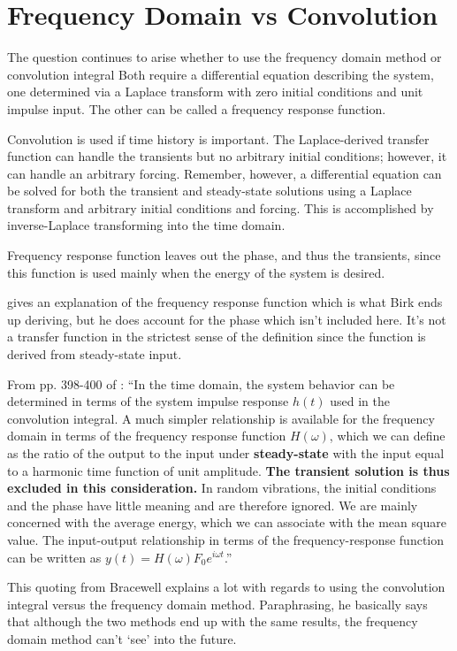 \documentclass[10pt,letterpaper]{article}
\begin{document}
\section{Frequency Domain vs Convolution}
The question continues to arise whether to use the frequency domain method or convolution integral 
Both require a differential equation describing the system, one determined via a Laplace transform with zero initial conditions and unit impulse input.
The other can be called a frequency response function.

Convolution is used if time history is important.
The Laplace-derived transfer function can handle the transients but no arbitrary initial conditions; however, it can handle an arbitrary forcing.
Remember, however, a differential equation can be solved for both the transient and steady-state solutions using a Laplace transform and arbitrary initial conditions and forcing.
This is accomplished by inverse-Laplace transforming into the time domain.

Frequency response function leaves out the phase, and thus the transients, since this function is used mainly when the energy of the system is desired.

\citet{thomson98.1} gives an explanation of the frequency response function which is what Birk ends up deriving, but he does account for the phase which isn't included here.
It's not a transfer function in the strictest sense of the definition since the function is derived from steady-state input.

From pp. 398-400 of \citet{thomson98.1}: ``In the time domain, the system behavior can be determined in terms of the system impulse response $h(t)$ used in the convolution integral.
A much simpler relationship is available for the frequency domain in terms of the frequency response function $H(\omega)$, which we can define as the ratio of the output to the input under \textbf{steady-state} with the input equal to a harmonic time function of unit amplitude.
\textbf{The transient solution is thus excluded in this consideration.}
In random vibrations, the initial conditions and the phase have little meaning and are therefore ignored.
We are mainly concerned with the average energy, which we can associate with the mean square value.
The input-output relationship in terms of the frequency-response function can be written as $y(t) = H(\omega)F_0 e^{i\omega t}$.''

This quoting from Bracewell explains a lot with regards to using the convolution integral versus the frequency domain method.
Paraphrasing, he basically says that although the two methods end up with the same results, the frequency domain method can't `see' into the future.
\end{document}
